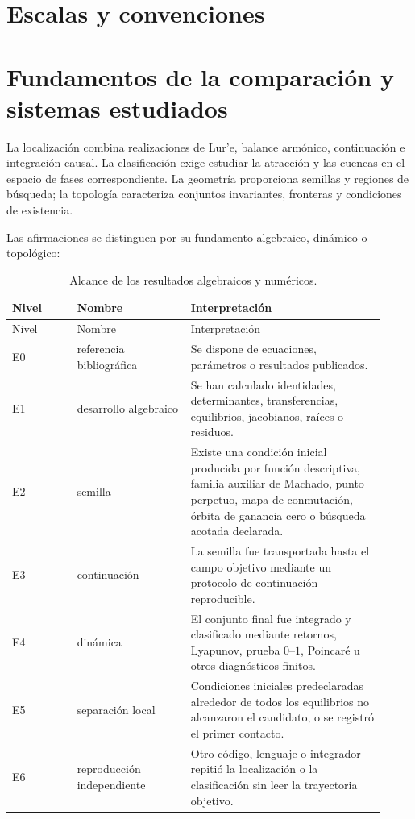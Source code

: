 \ifHAFOPedagogy
  \section{Escalas y convenciones}
  \label{sec:master-scope}
\else
  \section{Fundamentos de la comparación y sistemas estudiados}
  \label{sec:master-scope}

  La localización combina realizaciones de Lur'e, balance armónico,
  continuación e integración causal. La clasificación exige estudiar la
  atracción y las cuencas en el espacio de fases correspondiente. La geometría
  proporciona semillas y regiones de búsqueda; la topología caracteriza
  conjuntos invariantes, fronteras y condiciones de existencia.

  Las afirmaciones se distinguen por su fundamento algebraico, dinámico o
  topológico:
\fi

\begin{longtable}{@{}L{0.16\linewidth}L{0.28\linewidth}L{0.48\linewidth}@{}}
\caption{Alcance de los resultados algebraicos y numéricos.}\label{tab:master-levels}\\
\toprule
Nivel & Nombre & Interpretación\\
\midrule
\endfirsthead
\toprule
Nivel & Nombre & Interpretación\\
\midrule
\endhead
E0 & referencia bibliográfica & Se dispone de ecuaciones, parámetros o
resultados publicados.\\
E1 & desarrollo algebraico & Se han calculado identidades, determinantes,
transferencias, equilibrios, jacobianos, raíces o residuos.\\
E2 & semilla & Existe una condición inicial producida por función descriptiva,
familia auxiliar de Machado, punto perpetuo, mapa de conmutación, órbita de
ganancia cero o búsqueda acotada declarada.\\
E3 & continuación & La semilla fue transportada hasta el campo objetivo mediante
un protocolo de continuación reproducible.\\
E4 & dinámica & El conjunto final fue integrado y clasificado mediante
retornos, Lyapunov, prueba \(0\)--\(1\), Poincaré u otros diagnósticos finitos.\\
E5 & separación local & Condiciones iniciales predeclaradas alrededor de todos
los equilibrios no alcanzaron el candidato, o se registró el primer contacto.\\
E6 & reproducción independiente & Otro código, lenguaje o integrador repitió
la localización o la clasificación sin leer la trayectoria objetivo.\\
\bottomrule
\end{longtable}

